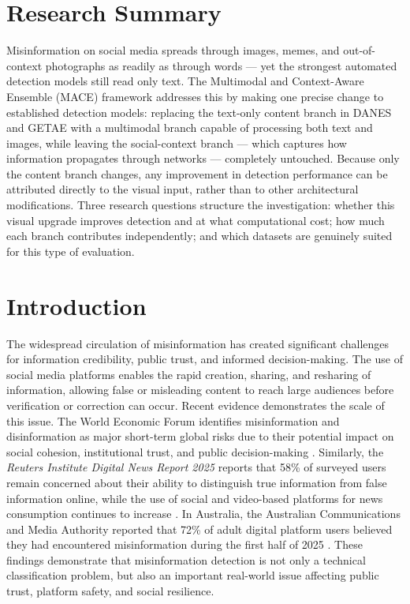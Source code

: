 \section*{Research Summary}

Misinformation on social media spreads through images, memes, and out-of-context photographs as readily as through words — yet the strongest automated detection models still read only text. The Multimodal and Context-Aware Ensemble (MACE) framework addresses this by making one precise change to established detection models: replacing the text-only content branch in DANES and GETAE with a multimodal branch capable of processing both text and images, while leaving the social-context branch — which captures how information propagates through networks — completely untouched. Because only the content branch changes, any improvement in detection performance can be attributed directly to the visual input, rather than to other architectural modifications. Three research questions structure the investigation: whether this visual upgrade improves detection and at what computational cost; how much each branch contributes independently; and which datasets are genuinely suited for this type of evaluation.

\section{Introduction}

The widespread circulation of misinformation has created significant challenges for information credibility, public trust, and informed decision-making. The use of social media platforms enables the rapid creation, sharing, and resharing of information, allowing false or misleading content to reach large audiences before verification or correction can occur. Recent evidence demonstrates the scale of this issue. The World Economic Forum identifies misinformation and disinformation as major short-term global risks due to their potential impact on social cohesion, institutional trust, and public decision-making \citep{WEF2025}. Similarly, the \textit{Reuters Institute Digital News Report 2025} reports that 58\% of surveyed users remain concerned about their ability to distinguish true information from false information online, while the use of social and video-based platforms for news consumption continues to increase \citep{Newman2025}. In Australia, the Australian Communications and Media Authority reported that 72\% of adult digital platform users believed they had encountered misinformation during the first half of 2025 \citep{ACMA2025}. These findings demonstrate that misinformation detection is not only a technical classification problem, but also an important real-world issue affecting public trust, platform safety, and social resilience.

